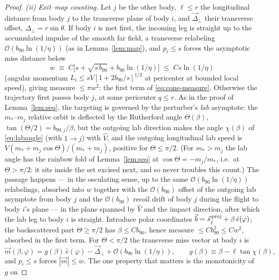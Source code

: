 \documentclass[11pt]{article}
\newcommand{\bv}{\vec b}
\newcommand{\Vh}{\hat V}
\newcommand{\order}[1]{\mathcal O\!\left(#1\right)}
\begin{document}
\begin{proof}
\emph{(ii) Exit--map counting.} Let $j$ be the other body, $\ell\le r$ the longitudinal distance
from body $j$ to the transverse plane of body $i$, and $\vec\Delta_\perp$ their transverse offset,
$\Delta_\perp=r\sin\theta$. If body $i$ is met first, the incoming leg is straight up to the
accumulated impulse of the smooth far field, a transverse relabeling $\order{b_{90}\ln(1/\eta)}$
(as in Lemma~\ref{lem:map}), and $p_i\le s$ forces the asymptotic miss distance below
\begin{equation}
  w\;\equiv\;C\big[s+\sqrt{s\,b_{90}}+b_{90}\ln(1/\eta)\big]\;\le\;Cs\ln(1/\eta)
  \label{eq:wdef}
\end{equation}
(angular momentum $L_i\le sV[1+2b_{90}/s]^{1/2}$ at pericenter at bounded local speed), giving
measure $\le\pi w^2$: the first term of \eqref{eq:cone-measure}. Otherwise the trajectory first
passes body $j$, at some pericenter $q\le r$. As in the proof of Lemma~\ref{lem:seq}, the
targeting is governed by the perturber's \emph{lab} asymptote: the $m_*$--$m_j$ relative orbit is
deflected by the Rutherford angle $\Theta(\beta)$, $\tan(\Theta/2)=b_{90,j}/\beta$, but the
outgoing lab direction makes the angle $\chi(\beta)$ of \eqref{eq:labangle} (with $1\to j$) with
$\Vh$, and the outgoing longitudinal lab speed is $V(m_*+m_j\cos\Theta)/(m_*+m_j)$, positive for
$\Theta\le\pi/2$. (For $m_*>m_j$ the lab angle has the rainbow fold of Lemma~\ref{lem:seq} at
$\cos\Theta=-m_j/m_*$, i.e.\ at $\Theta>\pi/2$: it sits inside the set excised next, and so never
troubles this count.) The passage happens --- in the osculating sense, up
to the same $\order{b_{90}\ln(1/\eta)}$ relabelings, absorbed into $w$ together with the
$\order{b_{90}}$ offset of the outgoing lab asymptote from body $j$ and the $\order{b_{90}}$
recoil drift of body $j$ during the flight to body $i$'s plane --- in the plane spanned by $\Vh$
and the impact direction, after which the lab leg to body $i$ is straight. Introduce polar
coordinates $\bv=\vec s_j^{\,\rm proj}+\beta\,\hat e(\varphi)$; the backscattered part
$\Theta\ge\pi/2$ has $\beta\le Cb_{90}$, hence measure $\le Cb_{90}^2\le Cw^2$, absorbed in the
first term. For $\Theta<\pi/2$ the transverse miss vector at body $i$ is
\begin{equation}
  \vec m(\beta,\varphi)=g(\beta)\,\hat e(\varphi)-\vec\Delta_\perp+\order{b_{90}\ln(1/\eta)},
  \qquad g(\beta)\equiv\beta-\ell\tan\chi(\beta),
  \label{eq:exit-map}
\end{equation}
and $p_i\le s$ forces $|\vec m|\le w$. The one property that matters is the monotonicity of $g$ on

\end{proof}
\end{document}
